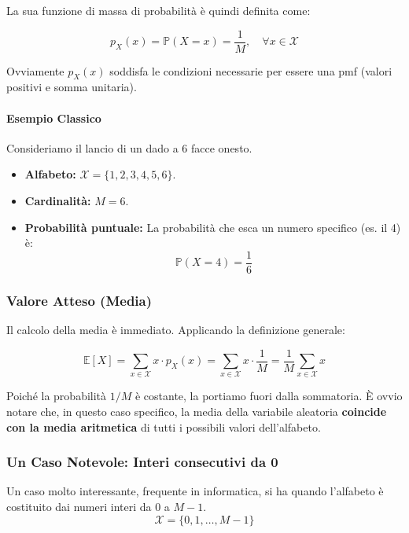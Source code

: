 La sua funzione di massa di probabilità è quindi definita come:

\begin{equation}
\boxed{p_X(x) = \mathbb{P}(X=x) = \frac{1}{M}, \quad \forall x \in \mathcal{X}}
\end{equation}

Ovviamente $p_X(x)$ soddisfa le condizioni necessarie per essere una pmf (valori positivi e somma unitaria).

\paragraph{Esempio Classico}
Consideriamo il lancio di un dado a 6 facce onesto.
\begin{itemize}
    \item \textbf{Alfabeto:} $\mathcal{X} = \{1, 2, 3, 4, 5, 6\}$.
    \item \textbf{Cardinalità:} $M = 6$.
    \item \textbf{Probabilità puntuale:} La probabilità che esca un numero specifico (es. il 4) è:
    \[ \mathbb{P}(X=4) = \frac{1}{6} \]
\end{itemize}

\subsubsection{Valore Atteso (Media)}

Il calcolo della media è immediato. Applicando la definizione generale:

\begin{equation}
\mathbb{E}[X] = \sum_{x \in \mathcal{X}} x \cdot p_X(x) = \sum_{x \in \mathcal{X}} x \cdot \frac{1}{M} = \frac{1}{M} \sum_{x \in \mathcal{X}} x
\end{equation}

Poiché la probabilità $1/M$ è costante, la portiamo fuori dalla sommatoria. È ovvio notare che, in questo caso specifico, la media della variabile aleatoria \textbf{coincide con la media aritmetica} di tutti i possibili valori dell'alfabeto.

\subsubsection{Un Caso Notevole: Interi consecutivi da 0}

Un caso molto interessante, frequente in informatica, si ha quando l'alfabeto è costituito dai numeri interi da $0$ a $M-1$.
\[ \mathcal{X} = \{0, 1, \dots, M-1\} \]

